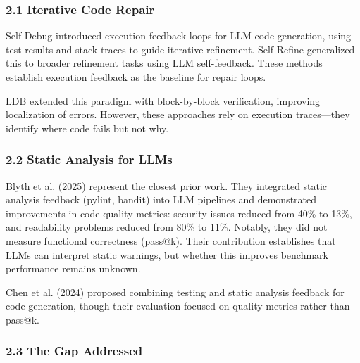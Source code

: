 
\subsubsection{2.1 Iterative Code Repair}

Self-Debug \citep{chen2023selfdebug} introduced execution-feedback loops for LLM code generation, using test results and stack traces to guide iterative refinement. Self-Refine \citep{madaan2023selfrefine} generalized this to broader refinement tasks using LLM self-feedback. These methods establish execution feedback as the baseline for repair loops.

LDB \citep{zhong2024ldb} extended this paradigm with block-by-block verification, improving localization of errors. However, these approaches rely on execution traces---they identify where code fails but not why.

\subsubsection{2.2 Static Analysis for LLMs}

Blyth et al. (2025) represent the closest prior work. They integrated static analysis feedback (pylint, bandit) into LLM pipelines and demonstrated improvements in code quality metrics: security issues reduced from 40\% to 13\%, and readability problems reduced from 80\% to 11\%. Notably, they did not measure functional correctness (pass@k). Their contribution establishes that LLMs can interpret static warnings, but whether this improves benchmark performance remains unknown.

Chen et al. (2024) proposed combining testing and static analysis feedback for code generation, though their evaluation focused on quality metrics rather than pass@k.

\subsubsection{2.3 The Gap Addressed}

\begin{table}[htbp]
\centering
{}
\end{table}

